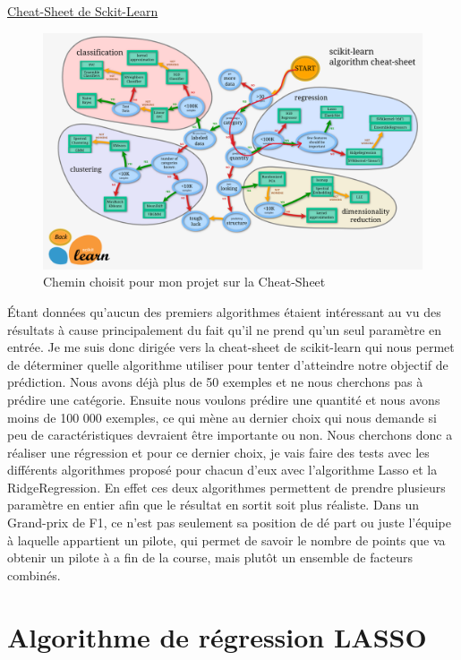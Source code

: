 \href{https://scikit-learn.org/stable/tutorial/machine_learning_map/index.html}{Cheat-Sheet de Sckit-Learn}\\

\begin{figure}[H]
    \centering
    \includegraphics[width=1\textwidth]{images/cheat-sheet.png} 
    \caption{Chemin choisit pour mon projet sur la Cheat-Sheet}
\end{figure}
Étant données qu'aucun des premiers algorithmes étaient intéressant au vu des résultats à cause principalement du fait qu'il ne prend qu'un seul paramètre en entrée. Je me suis donc dirigée vers la cheat-sheet de scikit-learn qui nous permet de déterminer quelle algorithme utiliser pour tenter d'atteindre notre objectif de prédiction. Nous avons déjà plus de 50 exemples et ne nous cherchons pas à prédire une catégorie. Ensuite nous voulons prédire une quantité et nous avons moins de 100 000 exemples, ce qui mène au dernier choix qui nous demande si peu de caractéristiques devraient être importante ou non. Nous cherchons donc a réaliser une régression et pour ce dernier choix, je vais faire des tests avec les différents algorithmes proposé pour chacun d'eux avec l'algorithme Lasso et la RidgeRegression. En effet ces deux algorithmes permettent de prendre plusieurs paramètre en entier afin que le résultat en sortit soit plus réaliste. Dans un Grand-prix de F1, ce n'est pas seulement sa position de dé part ou juste l'équipe à laquelle appartient un pilote, qui permet de savoir le nombre de points que va obtenir un pilote à a fin de la course, mais plutôt un ensemble de facteurs combinés. 

\section{Algorithme de régression LASSO}

